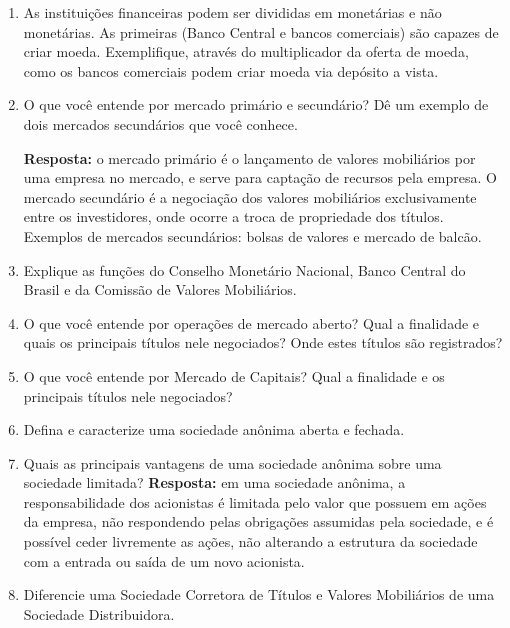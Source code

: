 \documentclass{article}
\begin{document}
\begin{enumerate}
    \item As instituições financeiras podem ser divididas em monetárias e não
        monetárias. As primeiras (Banco Central e bancos comerciais) são
        capazes de criar moeda. Exemplifique, através do multiplicador da
        oferta de moeda, como os bancos comerciais podem criar moeda via
        depósito a vista.

    \item O que você entende por mercado primário e secundário? Dê um exemplo
        de dois mercados secundários que você conhece.

        \textbf{Resposta:} o mercado primário é o lançamento de valores
        mobiliários por uma empresa no mercado, e serve para captação de
        recursos pela empresa. O mercado secundário é a negociação dos valores
        mobiliários exclusivamente entre os investidores, onde ocorre a troca
        de propriedade dos títulos. Exemplos de mercados secundários: bolsas de
        valores e mercado de balcão.

    \item Explique as funções do Conselho Monetário Nacional, Banco Central do
        Brasil e da Comissão de Valores Mobiliários.

    \item O que você entende por operações de mercado aberto? Qual a finalidade
        e quais os principais títulos nele negociados? Onde estes títulos são
        registrados?

    \item O que você entende por Mercado de Capitais? Qual a finalidade e os
        principais títulos nele negociados?

    \item Defina e caracterize uma sociedade anônima aberta e fechada.

    \item Quais as principais vantagens de uma sociedade anônima sobre uma
        sociedade limitada?
        \textbf{Resposta:} em uma sociedade anônima, a responsabilidade dos
        acionistas é limitada pelo valor que possuem em ações da empresa, não
        respondendo pelas obrigações assumidas pela sociedade, e é possível
        ceder livremente as ações, não alterando a estrutura da sociedade com a
        entrada ou saída de um novo acionista.

    \item Diferencie uma Sociedade Corretora de Títulos e Valores Mobiliários
        de uma Sociedade Distribuidora.


\end{enumerate}
\end{document}
